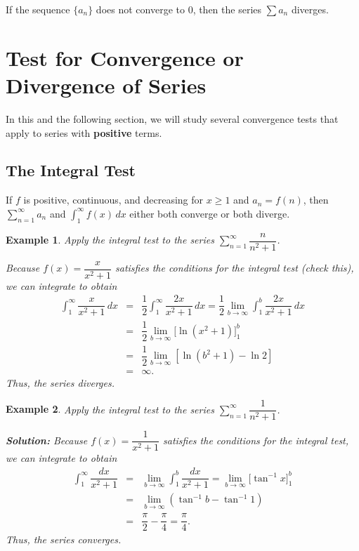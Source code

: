 \documentclass[titlepage,a4paper,12pt]{report}
\newtheorem{example}{Example}[section]
\begin{document}
\noindent If the sequence $\{a_n\}$ does not converge to $0$, then the series $\displaystyle \sum a_n$ diverges. 
\section{Test for Convergence or Divergence of Series}
In this and the following section, we will study several convergence tests that apply to series with \textbf{positive} terms.
\subsection{The Integral Test}
If $f$ is positive, continuous, and decreasing for $x\geq 1$ and $a_n=f(n)$, then $\displaystyle \sum _{n=1}^\infty a_n$ and $\displaystyle \int _1^\infty f(x)\, dx$ either both converge or both diverge.
\begin{example}
Apply the integral test to the series $\displaystyle \sum _{n=1}^\infty \dfrac{n}{n^2+1}$.

\noindent Because $f(x)=\dfrac{x}{x^2+1}$ satisfies the conditions for the integral test (check this), we can integrate to obtain
\begin{eqnarray*}
\int _1^\infty \dfrac{x}{x^2+1}\, dx &=& \dfrac{1}{2}\int _1^\infty \dfrac{2x}{x^2+1}\, dx =\dfrac{1}{2}\lim _{b\rightarrow \infty} \int _1^b \dfrac{2x}{x^2+1}\, dx \\
&=& \dfrac{1}{2}\lim _{b\rightarrow \infty}\biggl[\ln (x^2+1)\biggr]_1^b\\
&=& \dfrac{1}{2}\lim _{b\rightarrow \infty} [\ln (b^2+1)-\ln 2]\\
&=& \infty .
\end{eqnarray*}
Thus, the series \textit{diverges}.
\end{example}
\begin{example}
Apply the integral test to the series $\displaystyle \sum _{n=1}^\infty \dfrac{1}{n^2+1}$.

\noindent \textbf{Solution:} Because $f(x)=\dfrac{1}{x^2+1}$ satisfies the conditions for the integral test, we can integrate to obtain 
\begin{eqnarray*}
\int _1^\infty \dfrac{dx}{x^2+1} &=& \lim _{b\rightarrow \infty}\int _1^b \dfrac{dx}{x^2+1} = \lim _{b\rightarrow \infty} \biggl[\tan ^{-1} x\biggr]_1^b \\
&=& \lim _{b\rightarrow \infty} (\tan ^{-1} b-\tan ^{-1} 1) \\
&=& \dfrac{\pi}{2}-\dfrac{\pi}{4} =\dfrac{\pi}{4}.
\end{eqnarray*} 
Thus, the series \textit{converges}.
\end{example}
\end{document}
